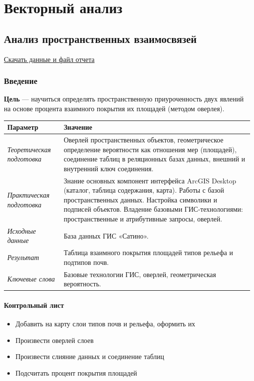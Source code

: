 \documentclass[12pt,]{book}
\providecommand{\tightlist}{%
  \setlength{\itemsep}{0pt}\setlength{\parskip}{0pt}}
\begin{document}
\hypertarget{part---1}{%
\part{Векторный анализ}\label{part---1}}

\hypertarget{overlay}{%
\chapter{Анализ пространственных взаимосвязей}\label{overlay}}

\href{http://autolab.geogr.msu.ru/gis/data/Ex10.zip}{Скачать данные и файл отчета}

\hypertarget{overlay-intro}{%
\section{Введение}\label{overlay-intro}}

\textbf{Цель} --- научиться определять пространственную приуроченность двух явлений на основе процента взаимного покрытия их площадей (методом оверлея).

\begin{longtable}[]{@{}ll@{}}
\toprule
Параметр & Значение\tabularnewline
\midrule
\endhead
\emph{Теоретическая подготовка} & Оверлей пространственных объектов, геометрическое определение вероятности как отношения мер (площадей), соединение таблиц в реляционных базах данных, внешний и внутренний ключ соединения.\tabularnewline
\emph{Практическая подготовка} & Знание основных компонент интерфейса ArcGIS Desktop (каталог, таблица содержания, карта). Работы с базой пространственных данных. Настройка символики и подписей объектов. Владение базовыми ГИС-технологиями: пространственные и атрибутивные запросы, оверлей.\tabularnewline
\emph{Исходные данные} & База данных ГИС «Сатино».\tabularnewline
\emph{Результат} & Таблица взаимного покрытия площадей типов рельефа и подтипов почв.\tabularnewline
\emph{Ключевые слова} & Базовые технологии ГИС, оверлей, геометрическая вероятность.\tabularnewline
\bottomrule
\end{longtable}

\hypertarget{overlay-control}{%
\subsection{Контрольный лист}\label{overlay-control}}

\begin{itemize}
\tightlist
\item
  Добавить на карту слои типов почв и рельефа, оформить их
\item
  Произвести оверлей слоев
\item
  Произвести слияние данных и соединение таблиц
\item
  Подсчитать процент покрытия площадей
\end{itemize}
\end{document}
